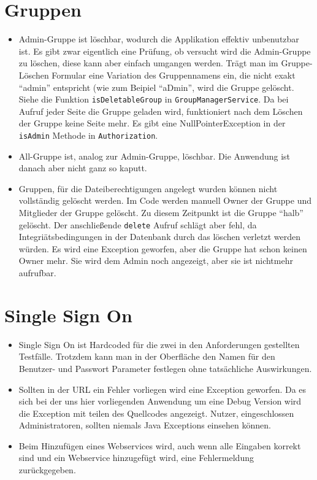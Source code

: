 \documentclass[12pt,DIV14,BCOR10mm,a4paper,parskip=half-,headsepline,headinclude,english,ngerman,bibliography=totocnumbered]{scrreprt}
\begin{document}
\section{Gruppen}
\begin{itemize}
\item Admin-Gruppe ist löschbar, wodurch die Applikation effektiv unbenutzbar ist. Es gibt zwar eigentlich eine Prüfung, ob versucht wird die Admin-Gruppe zu löschen, diese kann aber einfach umgangen werden. Trägt man im Gruppe-Löschen Formular eine Variation des Gruppennamens ein, die nicht exakt \enquote{admin} entspricht (wie zum Beipiel \enquote{aDmin}, wird die Gruppe gelöscht. Siehe die Funktion \texttt{isDeletableGroup} in \texttt{GroupManagerService}. Da bei Aufruf jeder Seite die Gruppe geladen wird, funktioniert nach dem Löschen der Gruppe keine Seite mehr. Es gibt eine NullPointerException in der \texttt{isAdmin} Methode in \texttt{Authorization}.
\item All-Gruppe ist, analog zur Admin-Gruppe, löschbar. Die Anwendung ist danach aber nicht ganz so kaputt.
\item Gruppen, für die Dateiberechtigungen angelegt wurden können nicht vollständig gelöscht werden. Im Code werden manuell Owner der Gruppe und Mitglieder der Gruppe gelöscht. Zu diesem Zeitpunkt ist die Gruppe \enquote{halb} gelöscht. Der anschließende \texttt{delete} Aufruf schlägt aber fehl, da Integriätsbedingungen in der Datenbank durch das löschen verletzt werden würden. Es wird eine Exception geworfen, aber die Gruppe hat schon keinen Owner mehr. Sie wird dem Admin noch angezeigt, aber sie ist nichtmehr aufrufbar.
\end{itemize}

\section{Single Sign On}
\begin{itemize}
 \item Single Sign On ist Hardcoded für die zwei in den Anforderungen gestellten Testfälle. Trotzdem kann man in der Oberfläche den Namen für den Benutzer- und Passwort Parameter festlegen ohne tatsächliche Auswirkungen.
  \item Sollten in der URL ein Fehler vorliegen wird eine Exception geworfen. Da es sich bei der uns hier vorliegenden Anwendung um eine Debug Version wird die Exception mit teilen des Quellcodes angezeigt. Nutzer, eingeschlossen Administratoren, sollten niemals Java Exceptions einsehen können.
  \item Beim Hinzufügen eines Webservices wird, auch wenn alle Eingaben korrekt sind und ein Webservice hinzugefügt wird, eine Fehlermeldung zurückgegeben.
 \end{itemize}
 
\end{document}
